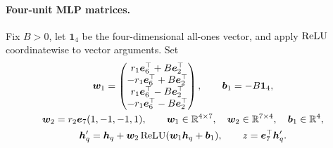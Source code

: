 \paragraph{Four-unit MLP matrices.}
Fix $B>0$, let $\bm1_4$ be the four-dimensional all-ones vector, and apply $\operatorname{ReLU}$ coordinatewise to vector arguments. Set
\begin{equation}
 \begin{gathered}
 \bm w_1=\begin{pmatrix}
 r_1\bm e_6^\top+B\bm e_2^\top\\
 -r_1\bm e_6^\top+B\bm e_2^\top\\
 r_1\bm e_6^\top-B\bm e_2^\top\\
 -r_1\bm e_6^\top-B\bm e_2^\top
 \end{pmatrix},\qquad
 \bm b_1=-B\bm1_4,\\
 \bm w_2=r_2\bm e_7(1,-1,-1,1),\qquad
 \bm w_1\in\mathbb R^{4\times7},\quad
 \bm w_2\in\mathbb R^{7\times4},\quad \bm b_1\in\mathbb R^4,\\
 \bm h'_q=\bm h_q+\bm w_2\operatorname{ReLU}(\bm w_1\bm h_q+\bm b_1),
 \qquad z=\bm e_7^\top\bm h'_q.
 \end{gathered}
 \label{eq:mlp-matrices}
\end{equation}

